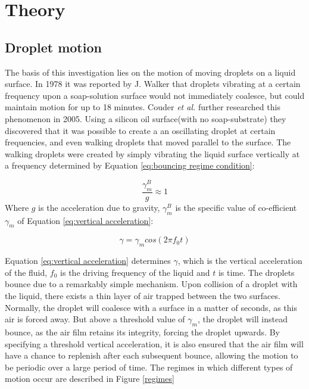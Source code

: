 \section{Theory}
\subsection{Droplet motion}
The basis of this investigation lies on the motion of moving droplets on a liquid surface. In 1978 it was reported by J. Walker \cite{Walker} that droplets vibrating at a certain frequency upon a soap-solution surface would not immediately coalesce, but could maintain motion for up to 18 minutes. Couder \textit{et al.} further researched this phenomenon in 2005. Using a silicon oil surface(with no soap-substrate) they discovered that it was possible to create a   an oscillating droplet at certain frequencies, and even walking droplets that moved parallel to the surface. 
The walking droplets were created by simply vibrating the liquid surface vertically at a frequency determined by Equation \ref{eq:bouncing regime condition}:

\begin{equation} \label{eq:bouncing regime condition}
\frac{\gamma_{m}^{B}}{g}\approx 1
\end{equation}
Where $g$ is the acceleration due to gravity, $\gamma_{m}^{B}$ is the specific value of co-efficient $\gamma_{m}$ of Equation \ref{eq:vertical acceleration}: 


\begin{equation} \label{eq:vertical acceleration}
\gamma=\gamma_{m}cos(2 \pi f_0t) 
\end{equation}

Equation \ref{eq:vertical acceleration} determines $\gamma$, which is the vertical acceleration of the fluid, $f_0$ is the driving frequency of the liquid and $t$ is time. The droplets bounce due to a remarkably simple mechanism. Upon collision of a droplet with the liquid, there exists a thin layer of air trapped between the two surfaces. Normally, the droplet will coalesce with a surface in a matter of seconds, as this air is forced away. But above a threshold value of $\gamma_{m}$, the droplet will instead bounce, as the air film retains its integrity, forcing the droplet upwards. By specifying a threshold vertical acceleration, it is also ensured that the air film will have a chance to replenish after each subsequent bounce, allowing the motion to be periodic over a large period of time. The regimes in which different types of motion occur are described in Figure \ref{regimes}


